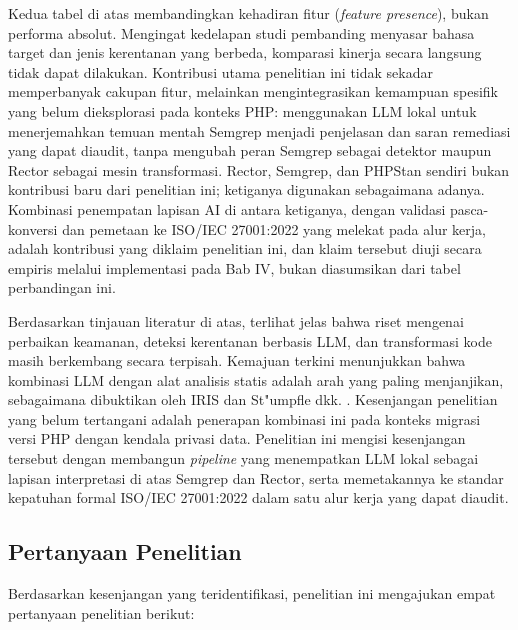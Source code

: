     Kedua tabel di atas membandingkan kehadiran fitur (\textit{feature presence}), bukan performa absolut. Mengingat kedelapan studi pembanding menyasar bahasa target dan jenis kerentanan yang berbeda, komparasi kinerja secara langsung tidak dapat dilakukan. Kontribusi utama penelitian ini tidak sekadar memperbanyak cakupan fitur, melainkan mengintegrasikan kemampuan spesifik yang belum dieksplorasi pada konteks PHP: menggunakan LLM lokal untuk menerjemahkan temuan mentah Semgrep menjadi penjelasan dan saran remediasi yang dapat diaudit, tanpa mengubah peran Semgrep sebagai detektor maupun Rector sebagai mesin transformasi. Rector, Semgrep, dan PHPStan sendiri bukan kontribusi baru dari penelitian ini; ketiganya digunakan sebagaimana adanya. Kombinasi penempatan lapisan AI di antara ketiganya, dengan validasi pasca-konversi dan pemetaan ke ISO/IEC 27001:2022 yang melekat pada alur kerja, adalah kontribusi yang diklaim penelitian ini, dan klaim tersebut diuji secara empiris melalui implementasi pada Bab IV, bukan diasumsikan dari tabel perbandingan ini.

    Berdasarkan tinjauan literatur di atas, terlihat jelas bahwa riset mengenai perbaikan keamanan, deteksi kerentanan berbasis LLM, dan transformasi kode masih berkembang secara terpisah. Kemajuan terkini menunjukkan bahwa kombinasi LLM dengan alat analisis statis adalah arah yang paling menjanjikan, sebagaimana dibuktikan oleh IRIS \cite{li2025iris} dan St"{u}mpfle dkk. \cite{stumpfle2025llm}. Kesenjangan penelitian yang belum tertangani adalah penerapan kombinasi ini pada konteks migrasi versi PHP dengan kendala privasi data. Penelitian ini mengisi kesenjangan tersebut dengan membangun \textit{pipeline} yang menempatkan LLM lokal sebagai lapisan interpretasi di atas Semgrep dan Rector, serta memetakannya ke standar kepatuhan formal ISO/IEC 27001:2022 dalam satu alur kerja yang dapat diaudit.
    \subsection{Pertanyaan Penelitian}

Berdasarkan kesenjangan yang teridentifikasi, penelitian ini mengajukan 
empat pertanyaan penelitian berikut:

